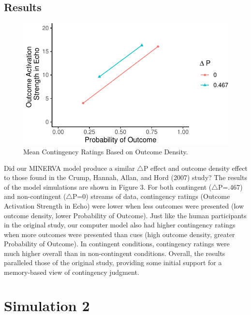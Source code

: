 \documentclass[
  english,
  man,floatsintext]{apa6}
\begin{document}
\hypertarget{results}{%
\subsection{Results}\label{results}}

\begin{figure}

{\centering \includegraphics{Thesis_google_test_files/figure-latex/unnamed-chunk-5-1} 

}

\caption{Mean Contingency Ratings Based on Outcome Density.}\label{fig:unnamed-chunk-5}
\end{figure}

Did our MINERVA model produce a similar \(\triangle\)P effect and outcome density effect to those found in the Crump, Hannah, Allan, and Hord (2007) study? The results of the model simulations are shown in Figure 3. For both contingent (\(\triangle\)P=.467) and non-contingent (\(\triangle\)P=0) streams of data, contingency ratings (Outcome Activation Strength in Echo) were lower when less outcomes were presented (low outcome density, lower Probability of Outcome). Just like the human participants in the original study, our computer model also had higher contingency ratings when more outcomes were presented than cues (high outcome density, greater Probability of Outcome). In contingent conditions, contingency ratings were much higher overall than in non-contingent conditions. Overall, the results paralleled those of the original study, providing some initial support for a memory-based view of contingency judgment.

\hypertarget{simulation-2}{%
\section{Simulation 2}\label{simulation-2}}
\end{document}
